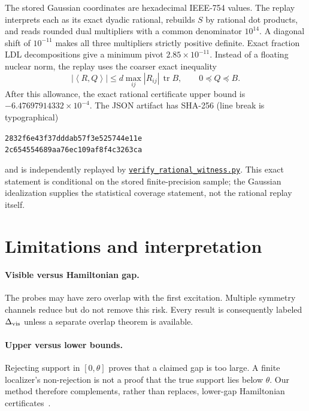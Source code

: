 \documentclass[11pt]{article}
\newcommand{\tr}{\operatorname{tr}}
\newcommand{\ip}[2]{\left\langle #1,#2\right\rangle}
\begin{document}
The stored Gaussian coordinates are hexadecimal IEEE-754 values.  The replay
interprets each as its exact dyadic rational, rebuilds $S$ by rational dot
products, and reads rounded dual multipliers with a common denominator
$10^{14}$.  A diagonal shift of $10^{-11}$ makes all three multipliers strictly
positive definite.  Exact fraction LDL decompositions give a minimum pivot
$2.85\times10^{-11}$.  Instead of a floating nuclear norm, the replay uses the
coarser exact inequality
\begin{equation}
 |\ip{R}{Q}|\le d\max_{ij}|R_{ij}|\,\tr B,
 \qquad 0\preceq Q\preceq B.
 \label{eq:rationalresidual}
\end{equation}
After this allowance, the exact rational certificate upper bound is
$-6.47697914332\times10^{-4}$.  The JSON artifact has SHA-256 (line break is
typographical)
\begin{center}\small
\texttt{2832f6e43f37dddab57f3e525744e11e}\\[-2pt]
\texttt{2c654554689aa76ec109af8f4c3263ca}
\end{center}
and is independently replayed by
\href{https://github.com/lluiseriksson/finite-sample-spectral-certificates/blob/main/verification/verify_rational_witness.py}{\texttt{verify\_rational\_witness.py}}.
This exact statement is conditional on the stored finite-precision sample; the
Gaussian idealization supplies the statistical coverage statement, not the
rational replay itself.

\section{Limitations and interpretation}

\paragraph{Visible versus Hamiltonian gap.}
The probes may have zero overlap with the first excitation.  Multiple symmetry
channels reduce but do not remove this risk.  Every result is consequently
labeled $\Delta_{\rm vis}$ unless a separate overlap theorem is available.

\paragraph{Upper versus lower bounds.}
Rejecting support in $[0,\theta]$ proves that a claimed gap is too large.  A
finite localizer's non-rejection is not a proof that the true support lies below
$\theta$.  Our method therefore complements, rather than replaces, lower-gap
Hamiltonian certificates~\cite{Rao2025}.
\end{document}
